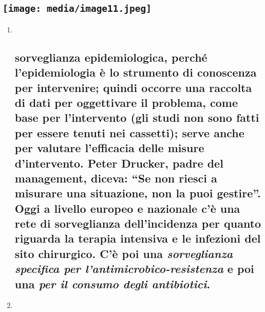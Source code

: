 \documentclass[]{article}
\begin{document}
\subsection{\texorpdfstring{\protect\texttt{[image: media/image11.jpeg]}}{}}\label{section-5}

\begin{enumerate}
\def\labelenumi{\arabic{enumi}.}
\item ~
  \subsection{\texorpdfstring{\textbf{sorveglianza epidemiologica},
  perché l'epidemiologia è lo strumento di conoscenza per intervenire;
  quindi occorre una raccolta di dati per oggettivare il problema, come
  base per l'intervento (gli studi non sono fatti per essere tenuti nei
  cassetti); serve anche per valutare l'efficacia delle misure
  d'intervento. Peter Drucker, padre del management, diceva: ``Se non
  riesci a misurare una situazione, non la puoi gestire''. Oggi a
  livello europeo e nazionale c'è una rete di sorveglianza
  dell'incidenza per quanto riguarda la terapia intensiva e le infezioni
  del sito chirurgico. C'è poi una \emph{sorveglianza specifica per
  l'antimicrobico-resistenza} e poi una \emph{per il consumo degli
  antibiotici}.}{sorveglianza epidemiologica, perché l'epidemiologia è lo strumento di conoscenza per intervenire; quindi occorre una raccolta di dati per oggettivare il problema, come base per l'intervento (gli studi non sono fatti per essere tenuti nei cassetti); serve anche per valutare l'efficacia delle misure d'intervento. Peter Drucker, padre del management, diceva: ``Se non riesci a misurare una situazione, non la puoi gestire''. Oggi a livello europeo e nazionale c'è una rete di sorveglianza dell'incidenza per quanto riguarda la terapia intensiva e le infezioni del sito chirurgico. C'è poi una sorveglianza specifica per l'antimicrobico-resistenza e poi una per il consumo degli antibiotici.}}\label{sorveglianza-epidemiologica-perchuxe9-lepidemiologia-uxe8-lo-strumento-di-conoscenza-per-intervenire-quindi-occorre-una-raccolta-di-dati-per-oggettivare-il-problema-come-base-per-lintervento-gli-studi-non-sono-fatti-per-essere-tenuti-nei-cassetti-serve-anche-per-valutare-lefficacia-delle-misure-dintervento.-peter-drucker-padre-del-management-diceva-se-non-riesci-a-misurare-una-situazione-non-la-puoi-gestire.-oggi-a-livello-europeo-e-nazionale-cuxe8-una-rete-di-sorveglianza-dellincidenza-per-quanto-riguarda-la-terapia-intensiva-e-le-infezioni-del-sito-chirurgico.-cuxe8-poi-una-sorveglianza-specifica-per-lantimicrobico-resistenza-e-poi-una-per-il-consumo-degli-antibiotici.}
\item ~

\end{enumerate}
\end{document}
